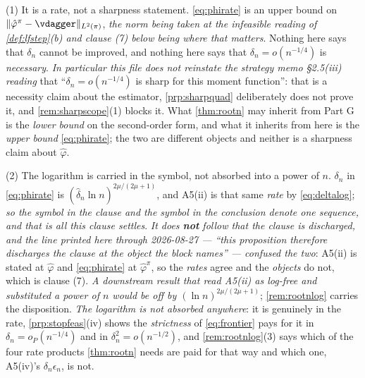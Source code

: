 \begin{remark}\label{rem:phirscope}
(1) It is a rate, not a sharpness statement. \eqref{eq:phirate} is an upper bound on
$\|\hat\varphi^{\pi}-\vdagger\|_{L^{2}(\pi)}$, \emph{the norm being taken at the infeasible reading of
\cref{def:lfstep}\textup{(b)} and clause \textup{(7)} below being where that matters}. Nothing here says that $\delta_n$ cannot be improved, and
nothing here says that $\delta_n=o(n^{-1/4})$ is \emph{necessary}. \emph{In particular this file does
not reinstate the strategy memo \S2.5(iii) reading} that ``$\delta_n=o(n^{-1/4})$ is sharp for this
moment function'': that is a necessity claim about the estimator, \cref{prp:sharpquad} deliberately
does not prove it, and \cref{rem:sharpscope}\textup{(1)} blocks it. What \cref{thm:rootn} may inherit
from Part G is the \emph{lower bound} on the second-order form, and what it inherits from here is the
\emph{upper bound} \eqref{eq:phirate}; the two are different objects and neither is a sharpness claim
about $\hat\varphi$.

(2) The logarithm is carried in the symbol, not absorbed into a power of $n$.
$\delta_n$ in \eqref{eq:phirate} is $(\hat\delta_n\ln n)^{2\mu/(2\mu+1)}$, and A5(ii) is
that same \emph{rate} by \eqref{eq:deltalog}; \emph{so the symbol in the clause and the symbol in the
conclusion denote one sequence, and that is all this clause settles}. \emph{It does \textbf{not} follow
that the clause is discharged, and the line printed here through 2026-08-27 --- ``this proposition
therefore discharges the clause at the object the block names'' --- confused the two}: A5(ii) is stated
at $\hat\varphi$ and \eqref{eq:phirate} at $\hat\varphi^{\pi}$, so the \emph{rates} agree and the
\emph{objects} do not, which is clause \textup{(7)}. \emph{A downstream result that read A5(ii) as log-free and substituted a
power of $n$ would be off by $(\ln n)^{2\mu/(2\mu+1)}$}; \cref{rem:rootnlog} carries the disposition.
\emph{The logarithm is not absorbed anywhere}: it is genuinely in the rate,
\cref{prp:stopfeas}\textup{(iv)} shows the \emph{strictness} of \eqref{eq:frontier} pays for it in
$\delta_n=o_P(n^{-1/4})$ and in $\delta_n^{2}=o(n^{-1/2})$, and \cref{rem:rootnlog}\textup{(3)} says which
of the four rate products \cref{thm:rootn} needs are paid for that way and which one, A5(iv)'s
$\delta_n\epsilon_n$, is not.


\end{remark}
